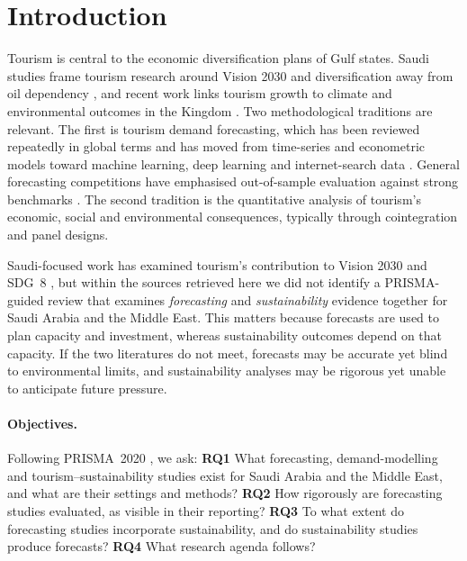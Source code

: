 \documentclass[11pt,a4paper]{article}
\begin{document}
\section{Introduction}
Tourism is central to the economic diversification plans of Gulf states. Saudi studies frame tourism research around Vision 2030 and diversification away from oil dependency \citep{Alamoudi2020,Abuhulaibah2026}, and recent work links tourism growth to climate and environmental outcomes in the Kingdom \citep{Chouari2025,Alfehaid2026,Raihan2025}. Two methodological traditions are relevant. The first is tourism demand forecasting, which has been reviewed repeatedly in global terms \citep{Song2019,Peng2014,Jiao2019} and has moved from time-series and econometric models toward machine learning, deep learning and internet-search data \citep{Law2019,Zhang2020}. General forecasting competitions have emphasised out-of-sample evaluation against strong benchmarks \citep{Makridakis2020,Makridakis2022}. The second tradition is the quantitative analysis of tourism's economic, social and environmental consequences, typically through cointegration and panel designs.

Saudi-focused work has examined tourism's contribution to Vision 2030 and SDG~8 \citep{Saudi2024sdg}, but within the sources retrieved here we did not identify a PRISMA-guided review that examines \emph{forecasting} and \emph{sustainability} evidence together for Saudi Arabia and the Middle East. This matters because forecasts are used to plan capacity and investment, whereas sustainability outcomes depend on that capacity. If the two literatures do not meet, forecasts may be accurate yet blind to environmental limits, and sustainability analyses may be rigorous yet unable to anticipate future pressure.

\paragraph{Objectives.} Following PRISMA~2020 \citep{Page2021,Page2021ee}, we ask: \textbf{RQ1} What forecasting, demand-modelling and tourism--sustainability studies exist for Saudi Arabia and the Middle East, and what are their settings and methods? \textbf{RQ2} How rigorously are forecasting studies evaluated, as visible in their reporting? \textbf{RQ3} To what extent do forecasting studies incorporate sustainability, and do sustainability studies produce forecasts? \textbf{RQ4} What research agenda follows?
\end{document}
